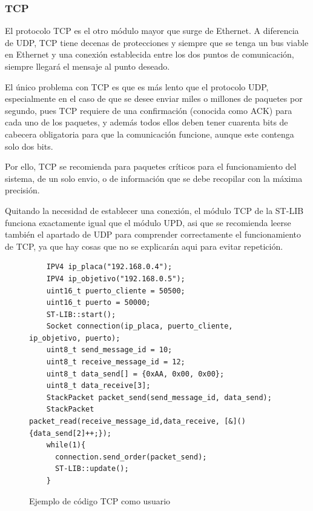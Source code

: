 \documentclass{report}
\begin{document}
 \subsubsection{TCP}
 El protocolo TCP es el otro módulo mayor que surge de Ethernet. A diferencia de UDP, TCP tiene decenas de protecciones y siempre que se tenga un bus viable en Ethernet y una conexión establecida entre los dos puntos de comunicación, siempre llegará el mensaje al punto deseado. \par \vspace{0.3cm}
 El único problema con TCP es que es más lento que el protocolo UDP, especialmente en el caso de que se desee enviar miles o millones de paquetes por segundo, pues TCP requiere de una confirmación (conocida como ACK) para cada uno de los paquetes, y además todos ellos deben tener cuarenta bits de cabecera obligatoria para que la comunicación funcione, aunque este contenga solo dos bits. \par 
 Por ello, TCP se recomienda para paquetes críticos para el funcionamiento del sistema, de un solo envio, o de información que se debe recopilar con la máxima precisión. \par \vspace{0.3cm}
 Quitando la necesidad de establecer una conexión, el módulo TCP de la ST-LIB funciona exactamente igual que el módulo UPD, asi que se recomienda leerse también el apartado de UDP para comprender correctamente el funcionamiento de TCP, ya que hay cosas que no se explicarán aqui para evitar repetición. \par 

\begin{figure}[h]
  \begin{lstlisting}
    IPV4 ip_placa("192.168.0.4");
    IPV4 ip_objetivo("192.168.0.5");
    uint16_t puerto_cliente = 50500;
    uint16_t puerto = 50000;
    ST-LIB::start();
    Socket connection(ip_placa, puerto_cliente, ip_objetivo, puerto);
    uint8_t send_message_id = 10;
    uint8_t receive_message_id = 12;
    uint8_t data_send[] = {0xAA, 0x00, 0x00}; 
    uint8_t data_receive[3]; 
    StackPacket packet_send(send_message_id, data_send);
    StackPacket packet_read(receive_message_id,data_receive, [&](){data_send[2]++;});
    while(1){
      connection.send_order(packet_send);
      ST-LIB::update();
    }
  \end{lstlisting}
  \caption{Ejemplo de código TCP como usuario}
  \label{TCPuserCode}
\end{figure}
\end{document}
